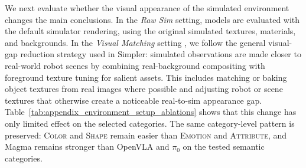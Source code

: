 \documentclass[11pt]{article}
\begin{document}
We next evaluate whether the visual appearance of the simulated environment changes the main conclusions.
In the \emph{Raw Sim} setting, models are evaluated with the default simulator rendering, using the original simulated textures, materials, and backgrounds.
In the \emph{Visual Matching} setting \cite{simpler}, we follow the general visual-gap reduction strategy used in Simpler: simulated observations are made closer to real-world robot scenes by combining real-background compositing with foreground texture tuning for salient assets.
This includes matching or baking object textures from real images where possible and adjusting robot or scene textures that otherwise create a noticeable real-to-sim appearance gap.
Table~\ref{tab:appendix_environment_setup_ablations} shows that this change has only limited effect on the selected categories.
The same category-level pattern is preserved: \textsc{Color} and \textsc{Shape} remain easier than \textsc{Emotion} and \textsc{Attribute}, and Magma remains stronger than OpenVLA and $\pi_0$ on the tested semantic categories.
\end{document}
